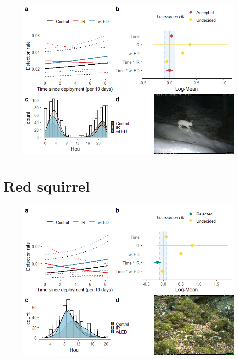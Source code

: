 \begin{table}[ht]
\begin{figure}
		  \centering
	\includegraphics[scale=.9]{../R/glmm_sp_files/figure-html/hare2-1.png}

\end{figure}





\newpage
\section{Red squirrel}

\begin{figure}
		  \centering
	\includegraphics[scale=.9]{../R/glmm_sp_files/figure-html/ekorn2-1.png}

\end{figure}








\end{table}
